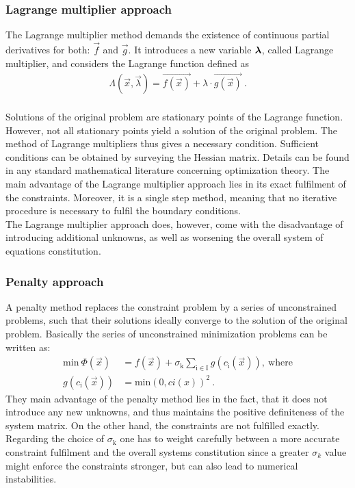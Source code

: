 \subsubsection{Lagrange multiplier approach}\label{sec:lagrange_multiplier_approach}
The Lagrange multiplier method demands the existence of continuous partial derivatives for both: $\vec{f}$ and $\vec{g}$. It introduces a new variable $\boldsymbol{ \mathsf{\lambda} }$, called Lagrange multiplier, and considers the Lagrange function defined as
\begin{align}
  \Lambda(\vec{x},\vec{\lambda})=\vec{f(\vec{x})}+\lambda\cdot\vec{g(\vec{x})}~. 
\end{align}
\\
Solutions of the original problem are stationary points of the Lagrange function. However, not all stationary points yield a solution of the original problem. The method of Lagrange multipliers thus gives a necessary condition. Sufficient conditions can be obtained by surveying the Hessian matrix. Details can be found in any standard mathematical literature concerning optimization theory.
The main advantage of the Lagrange multiplier approach lies in its exact fulfilment of the constraints. Moreover, it is a single step method, meaning that no iterative procedure is necessary to fulfil the boundary conditions.\\
The Lagrange multiplier approach does, however, come with the disadvantage of introducing additional unknowns, as well as worsening the overall system of equations constitution.
\subsubsection{Penalty approach}
A penalty method replaces the constraint problem by a series of unconstrained problems, such that their solutions ideally converge to the solution of the original problem. Basically the series of unconstrained minimization problems can be written as:
\begin{align}
  \text{min}~\Phi(\vec{x}) & =f(\vec{x})+\sigma_\mathrm k \sum_\mathrm {i \in I} g(c_\mathrm i(\vec{x})),~\text{where} \\
  g(c_\mathrm i(\vec{x}))  & = \text{min}(0,ci(x))^2~.                                                                 
\end{align}
They main advantage of the penalty method lies in the fact, that it does not introduce any new unknowns, and thus maintains the positive definiteness of the system matrix. On the other hand, the constraints are not fulfilled exactly. Regarding the choice of $\sigma_\mathrm k$ one has to weight carefully between a more accurate constraint fulfilment and the overall systems constitution since a greater $\sigma_k$ value might enforce the constraints stronger, but can also lead to numerical instabilities.
